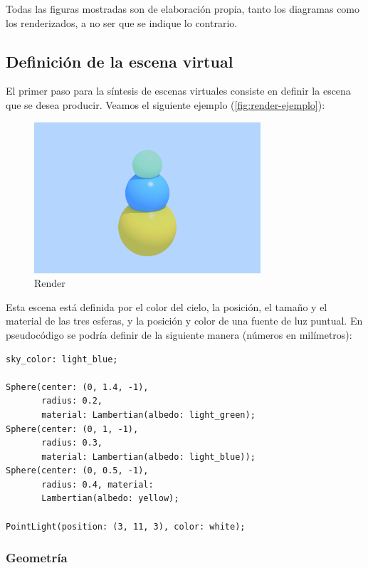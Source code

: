 \documentclass[10pt, a4paper]{article}
\begin{document}
Todas las figuras mostradas son de elaboración propia, tanto los diagramas como los renderizados, a no ser que se indique lo contrario.

\subsection{Definición de la escena virtual}

El primer paso para la síntesis de escenas virtuales consiste en definir la escena que se desea producir. Veamos el siguiente ejemplo (\autoref{fig:render-ejemplo}):

\begin{figure}[H]
    \centering 
    \includegraphics[width=0.75\textwidth]{00_example}
    \caption{Render}
    \label{fig:render-ejemplo}
\end{figure}

Esta escena está definida por el color del cielo, la posición, el tamaño y el material de las tres esferas, y la posición y color de una fuente de luz puntual. En pseudocódigo se podría definir de la siguiente manera (números en milímetros):

\begin{verbatim}
sky_color: light_blue;

Sphere(center: (0, 1.4, -1), 
       radius: 0.2, 
       material: Lambertian(albedo: light_green);
Sphere(center: (0, 1, -1), 
       radius: 0.3, 
       material: Lambertian(albedo: light_blue));
Sphere(center: (0, 0.5, -1), 
       radius: 0.4, material: 
       Lambertian(albedo: yellow);
       
PointLight(position: (3, 11, 3), color: white);
\end{verbatim}

\subsubsection{Geometría}
\end{document}
